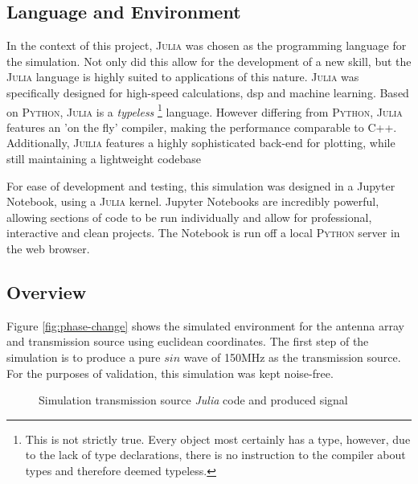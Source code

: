 \documentclass[class=report,11pt,crop=false]{standalone}
\begin{document}
\subsection{Language and Environment}
In the context of this project, \textsc{Julia} was chosen as the programming language for the simulation. Not only did this allow for the development of a new skill, but the \textsc{Julia} language is highly suited to applications of this nature. \textsc{Julia} was specifically designed for high-speed calculations, \gls{dsp} and machine learning. Based on \textsc{Python}, \textsc{Julia} is a \emph{typeless} \footnote{This is not strictly true. Every object most certainly has a type, however, due to the lack of type declarations, there is no instruction to the compiler about types and therefore deemed typeless.} language. However differing from \textsc{Python}, \textsc{Julia} features an 'on the fly' compiler, making the performance comparable to C++. Additionally, \textsc{Juilia} features a highly sophisticated back-end for plotting, while still maintaining a lightweight codebase

For ease of development and testing, this simulation was designed in a Jupyter Notebook, using a \textsc{Julia} kernel. Jupyter Notebooks are incredibly powerful, allowing sections of code to be run individually and allow for professional, interactive and clean projects. The Notebook is run off a local \textsc{Python} server in the web browser. 

\subsection{Overview}
Figure \ref{fig:phase-change} shows the simulated environment for the antenna array and transmission source using euclidean coordinates. The first step of the simulation is to produce a pure $sin$ wave of 150MHz as the transmission source. For the purposes of validation, this simulation was kept noise-free.

\begin{figure}[h]\centering
    \hfill
     \caption{Simulation transmission source \emph{Julia} code and produced signal}
    \label{fig:sim-transmission}
\end{figure}
\end{document}
